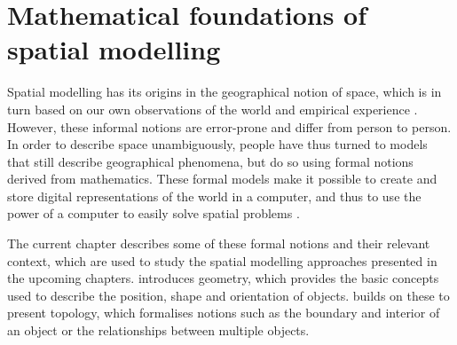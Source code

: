 
\chapter{Mathematical foundations of spatial modelling}
\label{ch:modelling-mathematics}

Spatial modelling has its origins in the geographical notion of space, which is in turn based on our own observations of the world and empirical experience \citep{Couclelis99}.
However, these informal notions are error-prone and differ from person to person.
In order to describe space unambiguously, people have thus turned to models that still describe geographical phenomena, but do so using formal notions derived from mathematics.
These formal models make it possible to create and store digital representations of the world in a computer, and thus to use the power of a computer to easily solve spatial problems \citep{Burrough86,Bailey95}.

The current chapter describes some of these formal notions and their relevant context, which are used to study the spatial modelling approaches presented in the upcoming chapters.
 introduces geometry, which provides the basic concepts used to describe the position, shape and orientation of objects.
 builds on these to present topology, which formalises notions such as the boundary and interior of an object or the relationships between multiple objects.




